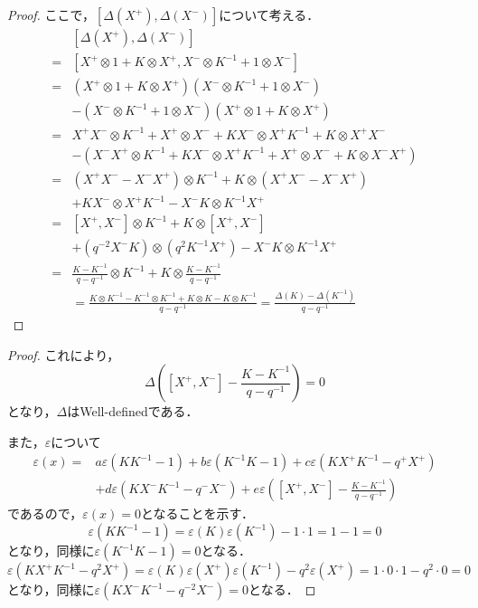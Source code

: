 \documentclass[10pt,dvipdfm]{beamer}
\begin{document}
  \begin{frame}
    \begin{proof}
      ここで，$[\Delta(X^+),\Delta(X^-)]$について考える．
      \begin{align*}
        &[\Delta(X^+),\Delta(X^-)] \\
        =& [X^+\otimes 1 + K\otimes X^+,X^-\otimes K^{-1} + 1\otimes X^-]\\
        =&(X^+\otimes 1 + K\otimes X^+)(X^-\otimes K^{-1} + 1\otimes X^-)\\
        &-(X^-\otimes K^{-1} + 1\otimes X^-)(X^+\otimes 1 + K\otimes X^+)\\
        =&X^+X^-\otimes K^{-1} + X^+\otimes X^- + KX^-\otimes X^+K^{-1} + K\otimes X^+X^-\\
        &-(X^-X^+\otimes K^{-1} + KX^- \otimes X^+K^{-1} + X^+\otimes X^- + K\otimes X^-X^+)\\
        =&(X^+X^- - X^-X^+)\otimes K^{-1} + K \otimes (X^+X^- - X^-X^+)\\
        &+ KX^-\otimes X^+K^{-1} - X^-K\otimes K^{-1}X^+\\
        =&[X^+,X^-]\otimes K^{-1} + K\otimes [X^+,X^-]\\
        &+ (q^{-2}X^-K)\otimes(q^2K^{-1}X^+) - X^-K\otimes K^{-1}X^+\\
        =&\frac{K-K^{-1}}{q-q^{-1}}\otimes K^{-1} + K\otimes \frac{K-K^{-1}}{q-q^{-1}}\\
        &= \frac{K\otimes K^{-1} - K^{-1}\otimes K^{-1}+K\otimes K -K\otimes K^{-1}}{q-q^{-1}}=\frac{\Delta(K) - \Delta(K^{-1})}{q-q^{-1}}
      \end{align*}
      \let\qedsymbol\relax
    \end{proof}
  \end{frame}
  \begin{frame}
    \begin{proof}
      これにより，
      \[
      \Delta\left([X^+,X^-] - \frac{K-K^{-1}}{q-q^{-1}}\right)=0
      \]
      となり，$\Delta$はWell-definedである．
      
      また，$\varepsilon$について
      \begin{align*}
        \varepsilon(x) =& a\varepsilon(KK^{-1}-1)+b\varepsilon(K^{-1}K-1)+c\varepsilon(KX^+K^{-1}-q^+X^+)\\
        &+d\varepsilon(KX^-K^{-1}-q^-X^-)+e\varepsilon\left([X^+,X^-]-\frac{K-K^{-1}}{q-q^{-1}}\right)
      \end{align*}
      であるので，$\varepsilon(x)=0$となることを示す．
      \[
        \varepsilon(KK^{-1}-1) = \varepsilon(K)\varepsilon(K^{-1}) - 1\cdot 1 = 1 - 1 = 0
      \]
      となり，同様に$\varepsilon(K^{-1}K-1)=0$となる．
      \[
        \varepsilon(KX^+K^{-1}-q^2X^+) = \varepsilon(K)\varepsilon(X^+)\varepsilon(K^{-1}) - q^2\varepsilon(X^+) = 1 \cdot 0 \cdot 1 - q^2 \cdot 0 = 0
      \]
      となり，同様に$\varepsilon(KX^-K^{-1}-q^{-2}X^-)=0$となる．
      \let\qedsymbol\relax
    \end{proof}
  \end{frame}
\end{document}

